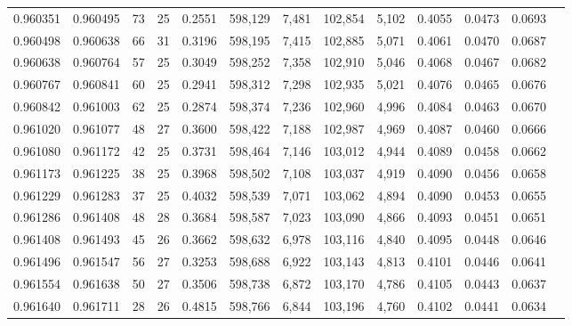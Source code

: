 \begin{tabular}{rrrrrrrrrrrrr}
0.960351 & 0.960495 &    73 &  25 &                                     0.2551 & 598,129 &   7,481 & 102,854 &   5,102 & 0.4055 & 0.0473 & 0.0693 \\
0.960498 & 0.960638 &    66 &  31 &                                     0.3196 & 598,195 &   7,415 & 102,885 &   5,071 & 0.4061 & 0.0470 & 0.0687 \\
0.960638 & 0.960764 &    57 &  25 &                                     0.3049 & 598,252 &   7,358 & 102,910 &   5,046 & 0.4068 & 0.0467 & 0.0682 \\
0.960767 & 0.960841 &    60 &  25 &                                     0.2941 & 598,312 &   7,298 & 102,935 &   5,021 & 0.4076 & 0.0465 & 0.0676 \\
0.960842 & 0.961003 &    62 &  25 &                                     0.2874 & 598,374 &   7,236 & 102,960 &   4,996 & 0.4084 & 0.0463 & 0.0670 \\
0.961020 & 0.961077 &    48 &  27 &                                     0.3600 & 598,422 &   7,188 & 102,987 &   4,969 & 0.4087 & 0.0460 & 0.0666 \\
0.961080 & 0.961172 &    42 &  25 &                                     0.3731 & 598,464 &   7,146 & 103,012 &   4,944 & 0.4089 & 0.0458 & 0.0662 \\
0.961173 & 0.961225 &    38 &  25 &                                     0.3968 & 598,502 &   7,108 & 103,037 &   4,919 & 0.4090 & 0.0456 & 0.0658 \\
0.961229 & 0.961283 &    37 &  25 &                                     0.4032 & 598,539 &   7,071 & 103,062 &   4,894 & 0.4090 & 0.0453 & 0.0655 \\
0.961286 & 0.961408 &    48 &  28 &                                     0.3684 & 598,587 &   7,023 & 103,090 &   4,866 & 0.4093 & 0.0451 & 0.0651 \\
0.961408 & 0.961493 &    45 &  26 &                                     0.3662 & 598,632 &   6,978 & 103,116 &   4,840 & 0.4095 & 0.0448 & 0.0646 \\
0.961496 & 0.961547 &    56 &  27 &                                     0.3253 & 598,688 &   6,922 & 103,143 &   4,813 & 0.4101 & 0.0446 & 0.0641 \\
0.961554 & 0.961638 &    50 &  27 &                                     0.3506 & 598,738 &   6,872 & 103,170 &   4,786 & 0.4105 & 0.0443 & 0.0637 \\
0.961640 & 0.961711 &    28 &  26 &                                     0.4815 & 598,766 &   6,844 & 103,196 &   4,760 & 0.4102 & 0.0441 & 0.0634 \\

\end{tabular}
